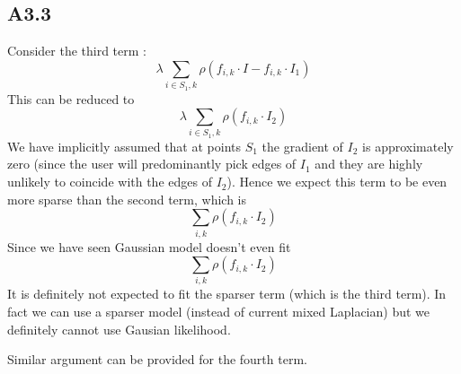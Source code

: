 \documentclass{article}
\begin{document}
\subsection*{A3.3}
Consider the third term :
$$\lambda \sum_{i \in S_1,k} \rho(f_{i,k}\cdot I - f_{i,k}\cdot I_1)$$
This can be reduced to
$$\lambda \sum_{i \in S_1,k} \rho(f_{i,k}\cdot I_2)$$
We have implicitly assumed that at points $S_1$ the gradient of $I_2$ is approximately zero (since the user will predominantly pick edges of $I_1$ and they are highly unlikely to coincide with the edges of $I_2$). Hence we expect this term to be even more sparse than the second term, which is $$\sum_{i,k} \rho(f_{i,k} \cdot I_2)$$
Since we have seen Gaussian model doesn't even fit $$\sum_{i,k} \rho(f_{i,k} \cdot I_2)$$ It is definitely not expected to fit the sparser term (which is the third term). In fact we can use a sparser model (instead of current mixed Laplacian) but we definitely cannot use Gausian likelihood.

Similar argument can be provided for the fourth term. 
\end{document}

